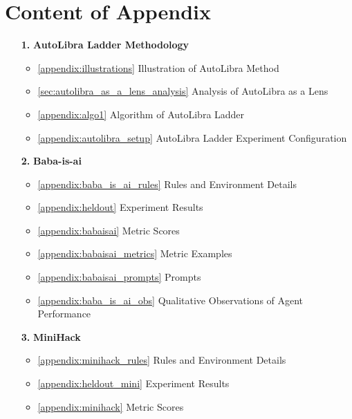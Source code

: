 \documentclass[../main.tex]{subfiles}
\begin{document}
\section*{Content of Appendix}
\begin{itemize}
	\item[\textbf{1.}] \textbf{AutoLibra Ladder Methodology}
		\begin{itemize}
            \item \ref{appendix:illustrations} Illustration of AutoLibra Method
            \item  \ref{sec:autolibra_as_a_lens_analysis} Analysis of AutoLibra as a Lens
			\item \ref{appendix:algo1} Algorithm of AutoLibra Ladder

			\item \ref{appendix:autolibra_setup} AutoLibra Ladder Experiment Configuration
		\end{itemize}

	\item[\textbf{2.}] \textbf{Baba-is-ai}
		\begin{itemize}

			\item \ref{appendix:baba_is_ai_rules} Rules and Environment Details

			\item \ref{appendix:heldout} Experiment Results

			\item \ref{appendix:babaisai} Metric Scores

			\item \ref{appendix:babaisai_metrics} Metric Examples

			\item \ref{appendix:babaisai_prompts} Prompts

			\item \ref{appendix:baba_is_ai_obs} Qualitative Observations of Agent Performance
		\end{itemize}

	\item[\textbf{3.}] \textbf{MiniHack}
		\begin{itemize}
			\item \ref{appendix:minihack_rules} Rules and Environment Details

			\item \ref{appendix:heldout_mini} Experiment Results

			\item \ref{appendix:minihack} Metric Scores


\end{itemize}
\end{itemize}
\end{document}
